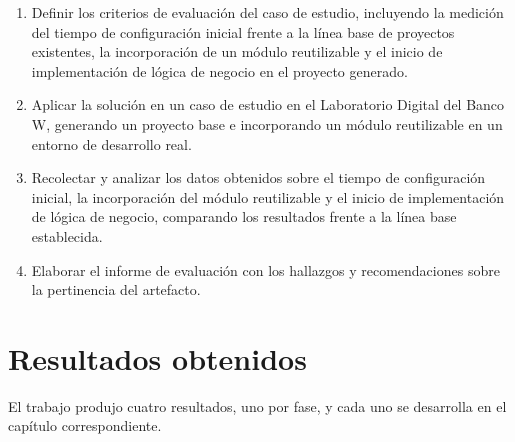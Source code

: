 \begin{enumerate}
    \item Definir los criterios de evaluación del caso de estudio, incluyendo la medición del tiempo de configuración inicial frente a la línea base de proyectos existentes, la incorporación de un módulo reutilizable y el inicio de implementación de lógica de negocio en el proyecto generado.

    \item Aplicar la solución en un caso de estudio en el Laboratorio Digital del Banco W, generando un proyecto base e incorporando un módulo reutilizable en un entorno de desarrollo real.

    \item Recolectar y analizar los datos obtenidos sobre el tiempo de configuración inicial, la incorporación del módulo reutilizable y el inicio de implementación de lógica de negocio, comparando los resultados frente a la línea base establecida.

    \item Elaborar el informe de evaluación con los hallazgos y recomendaciones sobre la pertinencia del artefacto.
\end{enumerate}

\section{Resultados obtenidos}

El trabajo produjo cuatro resultados, uno por fase, y cada uno se desarrolla
en el capítulo correspondiente.

